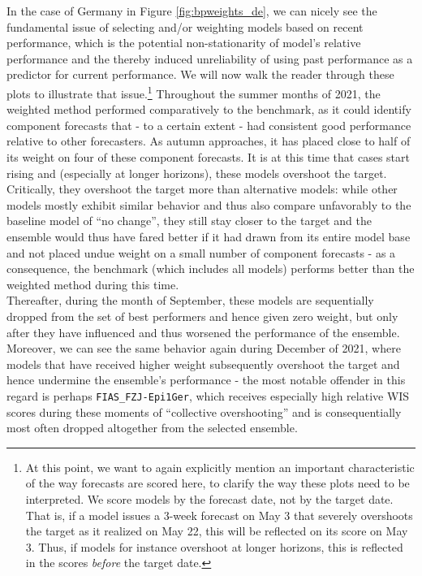 In the case of Germany in Figure \ref{fig:bpweights_de}, we can nicely see the fundamental issue of selecting and/or weighting models based on recent performance, which is the potential non-stationarity of model's relative performance and the thereby induced unreliability of using past performance as a predictor for current performance. We will now walk the reader through these plots to illustrate that issue.\footnote{At this point, we want to again explicitly mention an important characteristic of the way forecasts are scored here, to clarify the way these plots need to be interpreted. We score models by the forecast date, not by the target date. That is, if a model issues a 3-week forecast on May 3 that severely overshoots the target as it realized on May 22, this will be reflected on its score on May 3. Thus, if models for instance overshoot at longer horizons, this is reflected in the scores \textit{before} the target date.} Throughout the summer months of 2021, the weighted method performed comparatively to the benchmark, as it could identify component forecasts that - to a certain extent - had consistent good performance relative to other forecasters. As autumn approaches, it has placed close to half of its weight on four of these component forecasts. It is at this time that cases start rising and (especially at longer horizons), these models overshoot the target. Critically, they overshoot the target more than alternative models: while other models mostly exhibit similar behavior and thus also compare unfavorably to the baseline model of ``no change'', they still stay closer to the target and the ensemble would thus have fared better if it had drawn from its entire model base and not placed undue weight on a small number of component forecasts - as a consequence, the benchmark (which includes all models) performs better than the weighted method during this time.\\ 
Thereafter, during the month of September, these models are sequentially dropped from the set of best performers and hence given zero weight, but only after they have influenced and thus worsened the performance of the ensemble. Moreover, we can see the same behavior again during December of 2021, where models that have received higher weight subsequently overshoot the target and hence undermine the ensemble's performance - the most notable offender in this regard is perhaps \texttt{FIAS\_FZJ-Epi1Ger}, which receives especially high relative WIS scores during these moments of ``collective overshooting'' and is consequentially most often dropped altogether from the selected ensemble.\\ 

